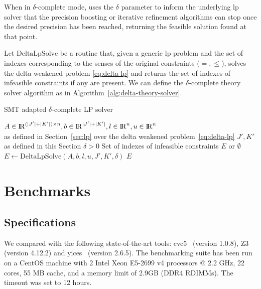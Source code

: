 \documentclass[runningheads]{llncs}
\begin{document}
When in $\delta$-complete mode, \dlinear uses the $\delta$ parameter to inform the underlying \gls{lp} solver that the precision boosting or iterative refinement algorithms can stop once the desired precision has been reached, returning the feasible solution found at that point.

Let $\text{DeltaLpSolve}$ be a routine that, given a generic \gls{lp} problem and the set of indexes corresponding to the senses of the original constraints ($=, \le$), solves the delta weakened problem \eqref{eq:delta-lp} and returns the set of indexes of infeasible constraints if any are present.
We can define the $\delta$-complete theory solver algorithm as in Algorithm~\ref{alg:delta-theory-solver}.

\begin{algorithm}
    \caption{SMT adapted $\delta$-complete LP solver}\label{alg:delta-theory-solver}
    \begin{algorithmic}
        \Require $A \in {\rm I\!R}^{(|J'| + |K'|) \times n}, b \in {\rm I\!R}^{|J'| + |K'|}, l \in {\rm I\!R}^n, u \in {\rm I\!R}^n$ \\
        \qquad as defined in Section~\ref{sec:lp} over the delta weakened problem~\eqref{eq:delta-lp}
        \Require $J', K'$ as defined in this Section
        \Require $\delta > 0$
        \Ensure Set of indexes of infeasible constraints $E$ or $\emptyset$
        \State $E \gets \text{DeltaLpSolve}(A, b, l, u, J', K', \delta)$ 
        \State \Return $E$
    \end{algorithmic}
\end{algorithm}

\section{Benchmarks}
\label{sec:benchmarks}
\subsection*{Specifications}

We compared \dlinear with the following state-of-the-art tools: cvc5~\cite{ref:cvc5} (version 1.0.8), Z3~\cite{ref:z3} (version 4.12.2) and yices~\cite{ref:yices} (version 2.6.5).
The benchmarking suite has been run on a CentOS machine with 2 Intel Xeon E5-2699 v4 processors @ 2.2 GHz, 22 cores, 55 MB cache, and a memory limit of 2.9GB (DDR4 RDIMMs).
The timeout was set to 12 hours.
\end{document}
